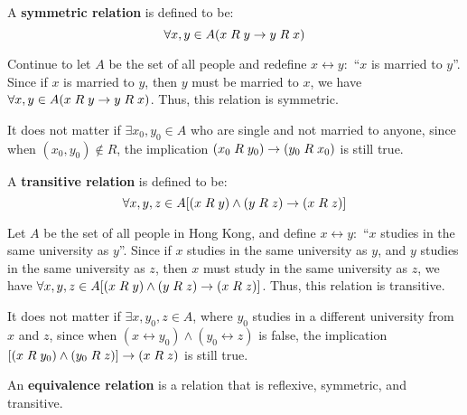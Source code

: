 \begin{definition}
    A \textbf{symmetric relation} is defined to be:
    \[
        \forall x, y \in A (x\mathrel R y \rightarrow y\mathrel R x)
    \]    
\end{definition}

\begin{example}
    Continue to let $A$ be the set of all people and redefine $x\rel y:$ ``$x$ is married to $y$''.
    Since if $x$ is married to $y$, then $y$ must be married to $x$, we have
    $\forall x, y \in A (x\mathrel R y \rightarrow y\mathrel R x)$.
    Thus, this relation is symmetric.
    \begin{remark}
        It does not matter if $\exists x_0, y_0\in A$ who are single and not married to anyone,
        since when $(x_0, y_0) \notin R$, the implication $(x_0\mathrel R y_0) \rightarrow (y_0\mathrel R x_0)$ is 
        still true.
    \end{remark}
\end{example}

\begin{definition}
    A \textbf{transitive relation} is defined to be:
    \[
        \forall x, y, z \in A [(x\mathrel R y) \land (y\mathrel R z) \rightarrow (x\mathrel R z)]
    \]
\end{definition}

\begin{example}
    Let $A$ be the set of all people in Hong Kong, and define $x\rel y:$ ``$x$ studies in the
    same university as $y$''.
    Since if $x$ studies in the same university as $y$, and $y$ studies in the same university
    as $z$, then $x$ must study in the same university as $z$, we have
    $\forall x, y, z \in A [(x\mathrel R y) \land (y\mathrel R z) \rightarrow (x\mathrel R z)]$.
    Thus, this relation is transitive.

    \begin{remark}
        It does not matter if $\exists x,y_0,z\in A$, where $y_0$ studies in a different
        university from $x$ and $z$, since when $(x\rel y_0) \land (y_0\rel z)$ is false,
        the implication $[(x\mathrel R y_0) \land (y_0\mathrel R z)] \rightarrow (x\mathrel R z)$ is still true.
    \end{remark}
\end{example}

\begin{definition}
    An \textbf{equivalence relation} is a relation that is reflexive, symmetric, and transitive.
\end{definition}

